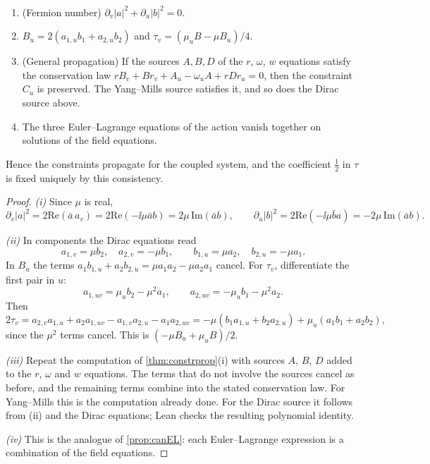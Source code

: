 \begin{theorem}\label{thm:ferconsist}\ver\
\begin{enumerate}[label=(\roman*)]
\item (Fermion number) $\partial_v|a|^2+\partial_u|b|^2=0$.
\item $B_u=2(a_{1,u}b_1+a_{2,u}b_2)$ and $\tau_v=(\mu_uB-\mu B_u)/4$.
\item (General propagation) If the sources $A,B,D$ of the $r$, $\omega$, $w$ equations satisfy the conservation law $rB_v+Br_v+A_u-\omega_uA+rDr_u=0$, then the constraint $C_u$ is preserved. The Yang--Mills source satisfies it, and so does the Dirac source above.
\item The three Euler--Lagrange equations of the action vanish together on solutions of the field equations.
\end{enumerate}
Hence the constraints propagate for the coupled system, and the coefficient $\frac12$ in $\tau$ is fixed uniquely by this consistency.
\end{theorem}
\begin{proof}
\emph{(i)} Since $\mu$ is real,
\[
\partial_v|a|^2=2\mathrm{Re}(\bar a\,a_v)=2\mathrm{Re}(-\ii\mu\bar ab)=2\mu\,\mathrm{Im}(\bar ab),\qquad\partial_u|b|^2=2\mathrm{Re}(-\ii\mu\bar ba)=-2\mu\,\mathrm{Im}(\bar ab).
\]

\emph{(ii)} In components the Dirac equations read
\[
a_{1,v}=\mu b_2,\quad a_{2,v}=-\mu b_1,\qquad b_{1,u}=\mu a_2,\quad b_{2,u}=-\mu a_1 .
\]
In $B_u$ the terms $a_1b_{1,u}+a_2b_{2,u}=\mu a_1a_2-\mu a_2a_1$ cancel. For $\tau_v$, differentiate the first pair in $u$:
\[
a_{1,uv}=\mu_ub_2-\mu^2a_1,\qquad a_{2,uv}=-\mu_ub_1-\mu^2a_2 .
\]
Then
\[
2\tau_v=a_{2,v}a_{1,u}+a_2a_{1,uv}-a_{1,v}a_{2,u}-a_1a_{2,uv}=-\mu(b_1a_{1,u}+b_2a_{2,u})+\mu_u(a_1b_1+a_2b_2),
\]
since the $\mu^2$ terms cancel. This is $(-\mu B_u+\mu_uB)/2$.

\emph{(iii)} Repeat the computation of \cref{thm:constrprop}(i) with sources $A$, $B$, $D$ added to the $r$, $\omega$ and $w$ equations. The terms that do not involve the sources cancel as before, and the remaining terms combine into the stated conservation law. For Yang--Mills this is the computation already done. For the Dirac source it follows from (ii) and the Dirac equations; Lean checks the resulting polynomial identity.

\emph{(iv)} This is the analogue of \cref{prop:canEL}: each Euler--Lagrange expression is a combination of the field equations.
\end{proof}


